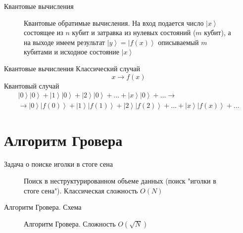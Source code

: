 \documentclass[10pt,pdf,hyperref={unicode}]{beamer}
\begin{document}
\begin{frame}{Квантовые вычисления}
\begin{figure}
\centering

\scalebox{.5}{}

\caption{Квантовые обратимые вычисления. На вход подается число
  $\left|x\right>$ состоящее из $n$ кубит и затравка из нулевых
  состояний ($m$ кубит), а на выходе имеем результат $\left|y\right> =
  \left|f\left(x\right)\right>$ описываемый $m$ кубитами и исходное
  состояние $\left|x\right>$} 
\label{figQuantCompQuantComp}
\end{figure}
\end{frame}


\begin{frame}{Квантовые вычисления}
Классический случай
\[
x \to f(x)
\]
Квантовый случай
\begin{eqnarray}
\left|0\right>\left|0\right> + \left|1\right>\left|0\right> + \left|2\right>\left|0\right> +
\dots + \left|x\right>\left|0\right> + \dots \to
\nonumber \\
\to 
\left|0\right>\left|f(0)\right> + \left|1\right>\left|f(1)\right> + \left|2\right>\left|f(2)\right> +
\dots + \left|x\right>\left|f(x)\right> + \dots
\nonumber
\end{eqnarray}
\end{frame}


\section{Алгоритм Гровера}
\begin{frame}{Задача о поиске иголки в стоге сена}
\begin{figure}
\centering



\caption{Поиск в неструктурированном объеме данных (поиск "иголки в
  стоге сена"). Классическая сложность $O(N)$}
\label{figQuantCompSearch}
\end{figure}
\end{frame}

\begin{frame}{Алгоритм Гровера. Схема}
\begin{figure}
\centering

\scalebox{.5}{}

\scalebox{.5}{}

\caption{Алгоритм Гровера. Сложность $ O(\sqrt{N})$}
\label{figQuantCompGrover}
\end{figure}
\end{frame}
\end{document}
